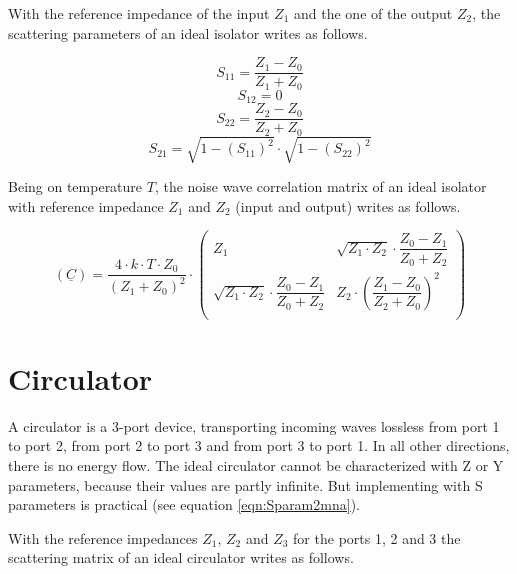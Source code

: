 With the reference impedance of the
input $Z_1$ and the one of the output $Z_2$, the scattering parameters
of an ideal isolator writes as follows.

\begin{equation}
S_{11} = \frac{Z_1-Z_0}{Z_1+Z_0}
\end{equation}
\begin{equation}
S_{12} = 0
\end{equation}
\begin{equation}
S_{22} = \frac{Z_2-Z_0}{Z_2+Z_0}
\end{equation}
\begin{equation}
S_{21} = \sqrt{1-(S_{11})^2}\cdot\sqrt{1-(S_{22})^2}
\end{equation}

Being on temperature $T$, the noise wave correlation matrix of an
ideal isolator with reference impedance $Z_1$ and $Z_2$ (input and
output) writes as follows.

\begin{equation}
(\underline{C}) = \frac{4\cdot k\cdot T\cdot Z_0}{(Z_1+Z_0)^2}\cdot
\begin{pmatrix}
  Z_1 & \sqrt{Z_1\cdot Z_2}\cdot\dfrac{Z_0-Z_1}{Z_0+Z_2}\\
  \sqrt{Z_1\cdot Z_2}\cdot\dfrac{Z_0-Z_1}{Z_0+Z_2} & Z_2\cdot\left(\dfrac{Z_1-Z_0}{Z_2+Z_0}\right)^2\\
\end{pmatrix}
\end{equation}


\section{Circulator}
\label{sec:CirculatorSparameter}

A circulator is a 3-port device, transporting incoming waves lossless
from port 1 to port 2, from port 2 to port 3 and from port 3 to port
1.  In all other directions, there is no energy flow.
The ideal circulator cannot be characterized with Z or Y parameters,
because their values are partly infinite.  But implementing with S
parameters is practical (see equation \ref{eqn:Sparam2mna}).

\addvspace{12pt}

With the
reference impedances $Z_1$, $Z_2$ and $Z_3$ for the ports 1, 2 and 3
the scattering matrix of an ideal circulator writes as follows.

